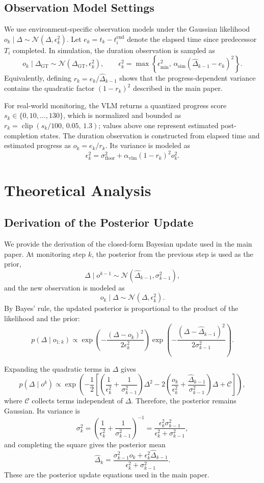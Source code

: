 \documentclass[letterpaper,10pt,onecolumn]{IEEEtran}
\begin{document}
\subsection{Observation Model Settings}
We use environment-specific observation models under the Gaussian likelihood
$o_k\mid\Delta\sim\mathcal{N}(\Delta,\epsilon_k^2)$. Let
$e_k=t_k-t_i^{\mathrm{end}}$ denote the elapsed time since predecessor $T_i$
completed. In simulation, the duration observation is sampled as
\[
o_k\mid\Delta_{\mathrm{GT}}
\sim\mathcal{N}(\Delta_{\mathrm{GT}},\epsilon_k^2),
\qquad
\epsilon_k^2=
\max\!\left\{\epsilon_{\min}^2,\,
\alpha_{\mathrm{sim}}(\hat{\Delta}_{k-1}-e_k)^2\right\}.
\]
Equivalently, defining $r_k=e_k/\hat{\Delta}_{k-1}$ shows that the
progress-dependent variance contains the quadratic factor $(1-r_k)^2$
described in the main paper.

For real-world monitoring, the VLM returns a quantized progress score
$s_k\in\{0,10,\ldots,130\}$, which is normalized and bounded as
$r_k=\operatorname{clip}(s_k/100,\,0.05,\,1.3)$; values above one
represent estimated post-completion states. The duration observation is
constructed from elapsed time and estimated progress as $o_k=e_k/r_k$.
Its variance is modeled as
\[
\epsilon_k^2=
\sigma_{\mathrm{floor}}^2+
\alpha_{\mathrm{vlm}}(1-r_k)^2o_k^2.
\]
\section{Theoretical Analysis}
\subsection{Derivation of the Posterior Update}\label{supp:derivation}
We provide the derivation of the closed-form Bayesian update used in the
main paper. At monitoring step $k$, the posterior from the previous step is
used as the prior,
\[
\Delta \mid o^{k-1}
\sim
\mathcal{N}(\hat{\Delta}_{k-1},\sigma_{k-1}^{2}),
\]
and the new observation is modeled as
\[
o_k \mid \Delta
\sim
\mathcal{N}(\Delta,\epsilon_k^{2}).
\]
By Bayes' rule, the updated posterior is proportional to the product of
the likelihood and the prior:
\[
p(\Delta \mid o_{1:k})
\propto
\exp\left(
-\frac{(\Delta-o_k)^2}{2\epsilon_k^2}
\right)
\exp\left(
-\frac{(\Delta-\hat{\Delta}_{k-1})^2}
{2\sigma_{k-1}^2}
\right).
\]

Expanding the quadratic terms in $\Delta$ gives
\[
p(\Delta \mid o^k)
\propto
\exp\left(
-\frac{1}{2}
\left[
\left(
\frac{1}{\epsilon_k^2}
+
\frac{1}{\sigma_{k-1}^2}
\right)\Delta^2
-
2\left(
\frac{o_k}{\epsilon_k^2}
+
\frac{\hat{\Delta}_{k-1}}{\sigma_{k-1}^2}
\right)\Delta
+
\mathcal{C}
\right]
\right),
\]
where $\mathcal{C}$ collects terms independent of $\Delta$.
Therefore, the posterior remains Gaussian. Its variance is
\[
\sigma_k^2
=
\left(
\frac{1}{\epsilon_k^2}
+
\frac{1}{\sigma_{k-1}^2}
\right)^{-1}
=
\frac{\epsilon_k^2\sigma_{k-1}^2}
{\epsilon_k^2+\sigma_{k-1}^2},
\]
and completing the square gives the posterior mean
\[
\hat{\Delta}_k
=
\frac{
\sigma_{k-1}^2 o_k
+
\epsilon_k^2\hat{\Delta}_{k-1}
}{
\epsilon_k^2+\sigma_{k-1}^2
}.
\]
These are the posterior update equations used in the main paper.
\end{document}
